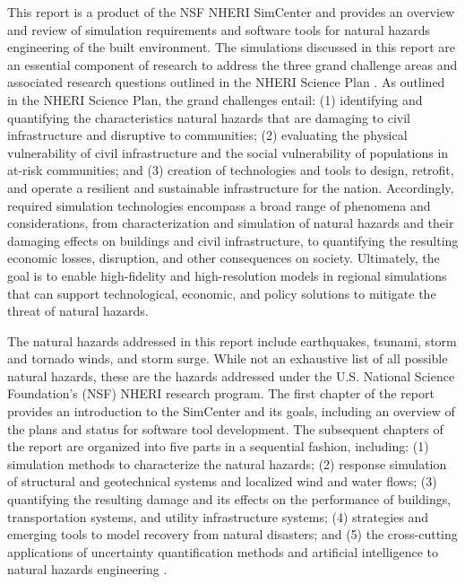 %
%

\preface

This report is a product of the NSF NHERI SimCenter and provides an overview and review of simulation requirements and software tools for natural hazards engineering of the built environment. The simulations discussed in this report are an essential component of research to address the three grand challenge areas and associated research questions outlined in the NHERI Science Plan \citep{edge2020natural}. As outlined in the NHERI Science Plan, the grand challenges entail: (1) identifying and quantifying the characteristics natural hazards that are damaging to civil infrastructure and disruptive to communities; (2) evaluating the physical vulnerability of civil infrastructure and the social vulnerability of populations in at-risk communities; and (3) creation of technologies and tools to design, retrofit, and operate a resilient and sustainable infrastructure for the nation. Accordingly, required simulation technologies encompass a broad range of phenomena and considerations, from characterization and simulation of natural hazards and their damaging effects on buildings and civil infrastructure, to quantifying the resulting economic losses, disruption, and other consequences on society. Ultimately, the goal is to enable high-fidelity and high-resolution models in regional simulations that can support technological, economic, and policy solutions to mitigate the threat of natural hazards.

The natural hazards addressed in this report include earthquakes, tsunami, storm and tornado winds, and storm surge. While not an exhaustive list of all possible natural hazards, these are the hazards addressed under the U.S. National Science Foundation's (NSF) NHERI research program. The first chapter of the report provides an introduction to the SimCenter and its goals, including an overview of the plans and status for software tool development.  The subsequent chapters of the report are organized into five parts in a sequential fashion, including: (1) simulation methods to characterize the natural hazards; (2) response simulation of structural and geotechnical systems and localized wind and water flows; (3) quantifying the resulting damage and its effects on the performance of buildings, transportation systems, and utility infrastructure systems; (4) strategies and emerging tools to model recovery from natural disasters; and (5) the cross-cutting applications of uncertainty quantification methods and artificial intelligence to natural hazards engineering . 

